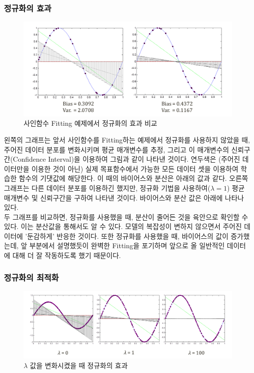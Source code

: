 \documentclass[a4paper]{oblivoir}
\begin{document}
\subsubsection{정규화의 효과}
\begin{figure}[ht]
\centering
\includegraphics[scale=0.5]{Regularization_Effect.png}
\caption{사인함수 Fitting 예제에서 정규화의 효과 비교}
\label{Figure 6-9}
\end{figure}

\indent 왼쪽의 그래프는 앞서 사인함수를 Fitting하는 예제에서 정규화를 사용하지 않았을 때, 주어진 데이터 분포를 변화시키며 평균 매개변수를 추정, 그리고 이 매개변수의 신뢰구간(Confidence Interval)을 이용하여 그림과 같이 나타낸 것이다. 연두색은 (주어진 데이터만을 이용한 것이 아닌) 실제 목표함수에서 가능한 모든 데이터 셋을 이용하여 학습한 함수의 기댓값에 해당한다. 이 때의 바이어스와 분산은 아래의 값과 같다. 오른쪽 그래프는 다른 데이터 분포를 이용하긴 했지만, 정규화 기법을 사용하여($\lambda = 1$) 평균 매개변수 및 신뢰구간을 구하여 나타낸 것이다. 바이어스와 분산 값은 아래에 나타나 있다. \\
\indent 두 그래프를 비교하면, 정규화를 사용했을 때, 분산이 줄어든 것을 육안으로 확인할 수 있다. 이는 분산값을 통해서도 알 수 있다. 모델의 복잡성이 변하지 않으면서 주어진 데이터에 '둔감하게' 반응한 것이다. 또한 정규화를 사용했을 때, 바이어스의 값이 증가했는데, 앞 부분에서 설명했듯이 완벽한 Fitting을 포기하며 앞으로 올 일반적인 데이터에 대해 더 잘 작동하도록 했기 때문이다.

\subsubsection{정규화의 최적화}
\begin{figure}[ht]
\centering
\includegraphics[scale=0.5]{Optimizing_Regularization.png}
\caption{$\lambda$ 값을 변화시켰을 때 정규화의 효과}
\label{Figure 6-10}
\end{figure}
\end{document}
